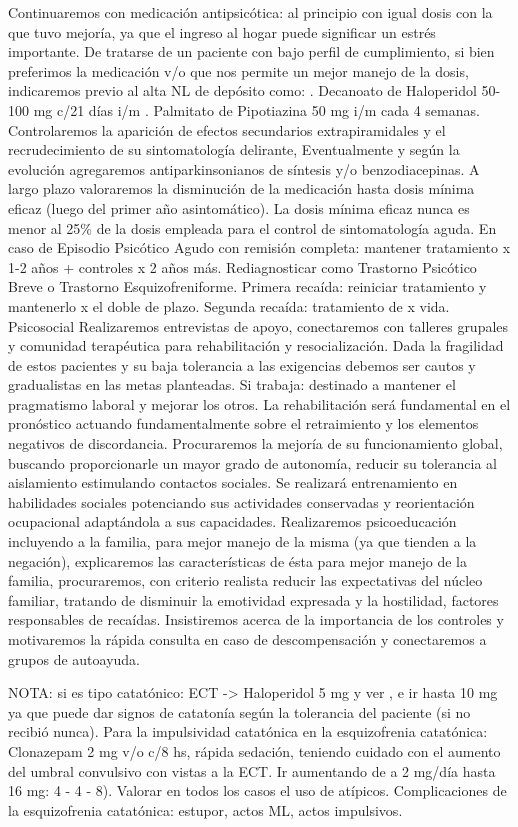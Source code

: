 Continuaremos con medicación antipsicótica: al principio con igual dosis con la que tuvo mejoría, ya que el ingreso al hogar puede significar un estrés importante. De tratarse de un paciente con bajo perfil de cumplimiento, si bien preferimos la medicación v/o que nos permite un mejor manejo de la dosis, indicaremos previo al alta NL de depósito como: . Decanoato de Haloperidol 50-100 mg c/21 días i/m . Palmitato de Pipotiazina 50 mg i/m cada 4 semanas. Controlaremos la aparición de efectos secundarios extrapiramidales y el recrudecimiento de su sintomatología delirante, Eventualmente y según la evolución agregaremos antiparkinsonianos de síntesis y/o benzodiacepinas. A largo plazo valoraremos la disminución de la medicación hasta dosis mínima eficaz (luego del primer año asintomático). La dosis mínima eficaz nunca es menor al 25\% de la dosis empleada para el control de sintomatología aguda. En caso de Episodio Psicótico Agudo con remisión completa: mantener tratamiento x 1-2 años + controles x 2 años más. Rediagnosticar como Trastorno Psicótico Breve o Trastorno Esquizofreniforme. Primera recaída: reiniciar tratamiento y mantenerlo x el doble de plazo. Segunda recaída: tratamiento de x vida. Psicosocial Realizaremos entrevistas de apoyo, conectaremos con talleres grupales y comunidad terapéutica para rehabilitación y resocialización. Dada la fragilidad de estos pacientes y su baja tolerancia a las exigencias debemos ser cautos y gradualistas en las metas planteadas. Si trabaja: destinado a mantener el pragmatismo laboral y mejorar los otros. La rehabilitación será fundamental en el pronóstico actuando fundamentalmente sobre el retraimiento y los elementos negativos de discordancia. Procuraremos la mejoría de su funcionamiento global, buscando proporcionarle un mayor grado de autonomía, reducir su tolerancia al aislamiento estimulando contactos sociales. Se realizará entrenamiento en habilidades sociales potenciando sus actividades conservadas y reorientación ocupacional adaptándola a sus capacidades. Realizaremos psicoeducación incluyendo a la familia, para mejor manejo de la misma (ya que tienden a la negación), explicaremos las características de ésta para mejor manejo de la familia, procuraremos, con criterio realista reducir las expectativas del núcleo familiar, tratando de disminuir la emotividad expresada y la hostilidad, factores responsables de recaídas. Insistiremos acerca de la importancia de los controles y motivaremos la rápida consulta en caso de descompensación y conectaremos a grupos de autoayuda.

NOTA: si es tipo catatónico: ECT -> Haloperidol 5 mg y ver , e ir hasta 10 mg ya que puede dar signos de catatonía según la tolerancia del paciente (si no recibió nunca). Para la impulsividad catatónica en la esquizofrenia catatónica: Clonazepam 2 mg v/o c/8 hs, rápida sedación, teniendo cuidado con el aumento del umbral convulsivo con vistas a la ECT. Ir aumentando de a 2 mg/día hasta 16 mg: 4 - 4 - 8). Valorar en todos los casos el uso de atípicos. Complicaciones de la esquizofrenia catatónica: estupor, actos ML, actos impulsivos.
\printbibliography[]

